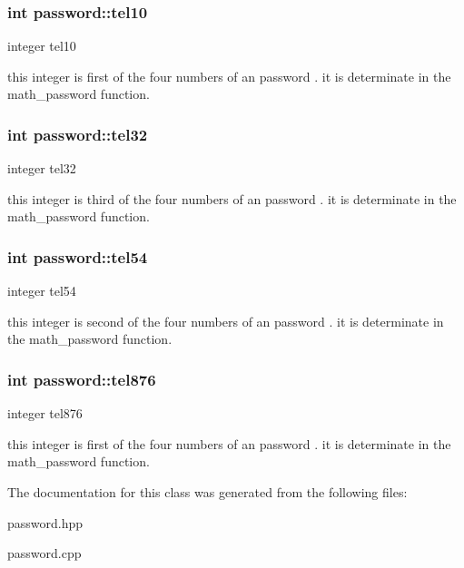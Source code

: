 \subsubsection[{\texorpdfstring{tel10}{tel10}}]{\setlength{\rightskip}{0pt plus 5cm}int password\+::tel10\hspace{0.3cm}{\ttfamily [protected]}}\hypertarget{classpassword_af09c363ed2ec22c8e900fdd6bf66c1f6}{}\label{classpassword_af09c363ed2ec22c8e900fdd6bf66c1f6}


integer tel10 

this integer is first of the four numbers of an password . it is determinate in the math\+\_\+password function. 
\subsubsection[{\texorpdfstring{tel32}{tel32}}]{\setlength{\rightskip}{0pt plus 5cm}int password\+::tel32\hspace{0.3cm}{\ttfamily [protected]}}\hypertarget{classpassword_a93ef3ccb4e71a683115c12435c89411d}{}\label{classpassword_a93ef3ccb4e71a683115c12435c89411d}


integer tel32 

this integer is third of the four numbers of an password . it is determinate in the math\+\_\+password function. 
\subsubsection[{\texorpdfstring{tel54}{tel54}}]{\setlength{\rightskip}{0pt plus 5cm}int password\+::tel54\hspace{0.3cm}{\ttfamily [protected]}}\hypertarget{classpassword_ad5afb40aeb150953f66a1c14745297bc}{}\label{classpassword_ad5afb40aeb150953f66a1c14745297bc}


integer tel54 

this integer is second of the four numbers of an password . it is determinate in the math\+\_\+password function. 
\subsubsection[{\texorpdfstring{tel876}{tel876}}]{\setlength{\rightskip}{0pt plus 5cm}int password\+::tel876\hspace{0.3cm}{\ttfamily [protected]}}\hypertarget{classpassword_a0e2e6d171003a3a8594a2cfec2b9c059}{}\label{classpassword_a0e2e6d171003a3a8594a2cfec2b9c059}


integer tel876 

this integer is first of the four numbers of an password . it is determinate in the math\+\_\+password function. 

The documentation for this class was generated from the following files\+:\begin{DoxyCompactItemize}
\item 
password.\+hpp\item 
password.\+cpp\end{DoxyCompactItemize}
